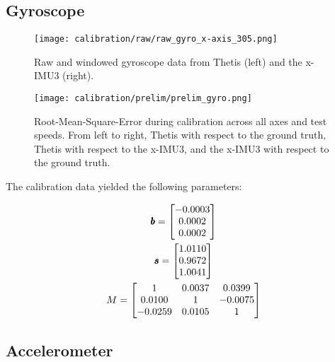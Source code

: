 \subsection{Gyroscope}

\begin{figure}
    \centering
    \texttt{[image: calibration/raw/raw\_gyro\_x-axis\_305.png]}
    \caption[Raw and Windowed Gyroscope Data]{Raw and windowed gyroscope data from Thetis (left) and the x-IMU3 (right).}
\end{figure}

\begin{figure}
    \centering
    \texttt{[image: calibration/prelim/prelim\_gyro.png]}
    \caption[Cummulative Gyroscope Error]{Root-Mean-Square-Error during calibration across all axes and test speeds. From left to right, Thetis with respect to the ground truth, Thetis with respect to the x-IMU3, and the x-IMU3 with respect to the ground truth.}
\end{figure}

The calibration data yielded the following parameters:

\begin{gather}
    \pmb{b} = \begin{bmatrix} \labeq{accelerometer_bias}
        -0.0003 \\
        0.0002 \\
        0.0002 \\
    \end{bmatrix} \\
    \pmb{s} = \begin{bmatrix} \labeq{accelerometer_sensitivity}
        1.0110 \\
        0.9672 \\
        1.0041 \\
    \end{bmatrix} \\
    M = \begin{bmatrix} \labeq{accelerometer_misalignment}
        1 & 0.0037 & 0.0399 \\
        0.0100 & 1 & -0.0075 \\
        -0.0259 & 0.0105 & 1 \\
    \end{bmatrix}
\end{gather}

\subsection{Accelerometer}

